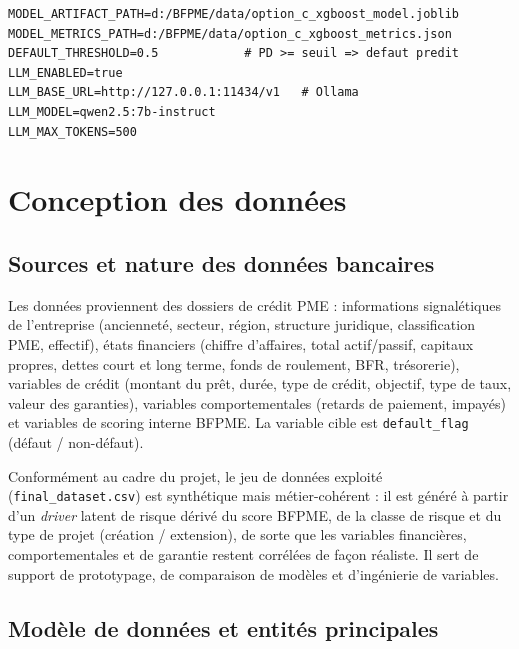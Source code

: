 \documentclass[a4paper,12pt,oneside]{report}
\newenvironment{codeblock}
  {\par\medskip\noindent\begin{minipage}{\linewidth}}
  {\end{minipage}\par\medskip}
\begin{document}
\begin{codeblock}
\begin{lstlisting}[caption={Extrait de configuration (.env)}, label={lst:env}]
MODEL_ARTIFACT_PATH=d:/BFPME/data/option_c_xgboost_model.joblib
MODEL_METRICS_PATH=d:/BFPME/data/option_c_xgboost_metrics.json
DEFAULT_THRESHOLD=0.5            # PD >= seuil => defaut predit
LLM_ENABLED=true
LLM_BASE_URL=http://127.0.0.1:11434/v1   # Ollama
LLM_MODEL=qwen2.5:7b-instruct
LLM_MAX_TOKENS=500
\end{lstlisting}
\end{codeblock}

\section{Conception des données}

\subsection{Sources et nature des données bancaires}

Les données proviennent des dossiers de crédit PME : informations signalétiques de
l'entreprise (ancienneté, secteur, région, structure juridique, classification PME,
effectif), états financiers (chiffre d'affaires, total actif/passif, capitaux
propres, dettes court et long terme, fonds de roulement, BFR, trésorerie), variables
de crédit (montant du prêt, durée, type de crédit, objectif, type de taux, valeur des
garanties), variables comportementales (retards de paiement, impayés) et variables
de scoring interne BFPME. La variable cible est \texttt{default\_flag} (défaut /
non-défaut).

Conformément au cadre du projet, le jeu de données exploité
(\texttt{final\_dataset.csv}) est synthétique mais métier-cohérent : il est
généré à partir d'un \textit{driver} latent de risque dérivé du score BFPME, de la
classe de risque et du type de projet (création / extension), de sorte que les
variables financières, comportementales et de garantie restent corrélées de façon
réaliste. Il sert de support de prototypage, de comparaison de modèles et
d'ingénierie de variables.

\subsection{Modèle de données et entités principales}
\end{document}
